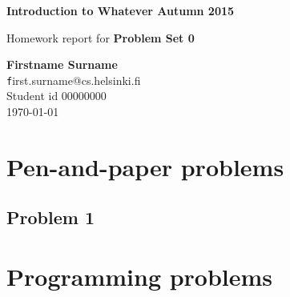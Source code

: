 \documentclass[12pt]{article}
\makeatletter
\newcommand{\Student}{Firstname Surname}
\newcommand{\StudentId}{00000000}
\newcommand{\Email}{first.surname@cs.helsinki.fi}
\newcommand{\CourseName}{Introduction to Whatever \hfill Autumn 2015}
\newcommand{\ProblemSet}{Problem Set 0}
\makeatother
\begin{document}

    \noindent
    {\bf \CourseName}

    \noindent
    Homework report for
    {\bf \ProblemSet}

    \bigskip

    {\raggedright
        {\bf \Student} \\
        {\texttt \Email } \\
        Student id \StudentId \\
        \today
    }


    \tableofcontents

    \newpage


    \section{Pen-and-paper problems}
    \label{sec:pen_and_paper_problems}


    \subsection{Problem 1}
    \label{sub:problem_1}

    \section{Programming problems}
    \label{sec:programming_problems}
\end{document}
